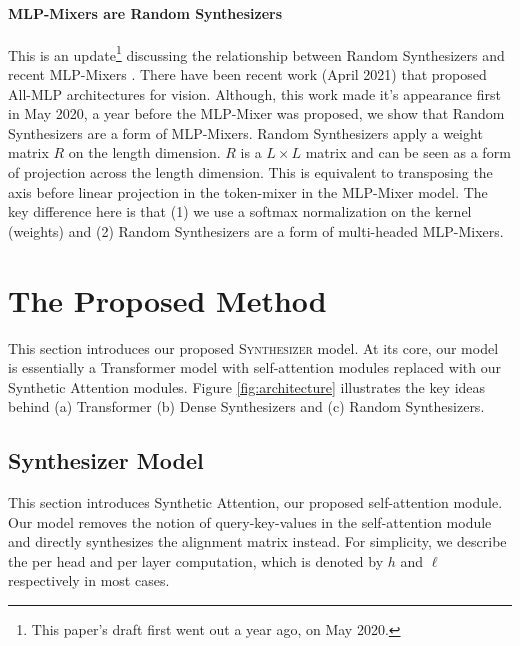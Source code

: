 \documentclass{article}
\begin{document}
\paragraph{MLP-Mixers are Random Synthesizers}
This is an update\footnote{This paper's draft first went out a year ago, on May 2020.} discussing the relationship between Random Synthesizers and recent MLP-Mixers \citep{tolstikhin2021mlp}. There have been recent work (April 2021) that proposed All-MLP architectures for vision. Although, this work made it's appearance first in May 2020, a year before the MLP-Mixer was proposed, we show that Random Synthesizers are a form of MLP-Mixers. Random Synthesizers apply a weight matrix $R$ on the length dimension. $R$ is a $L \times L$ matrix and can be seen as a form of projection across the length dimension. This is equivalent to transposing the axis before linear projection in the token-mixer in the MLP-Mixer model. The key difference here is that (1) we use a softmax normalization on the kernel (weights) and (2) Random Synthesizers are a form of multi-headed MLP-Mixers.

\section{The Proposed Method}
This section introduces our proposed \textsc{Synthesizer} model. At its core, our model is essentially a Transformer model with self-attention modules replaced with our Synthetic Attention modules. Figure \ref{fig:architecture} illustrates the key ideas behind (a) Transformer (b) Dense Synthesizers and (c) Random Synthesizers.

\subsection{Synthesizer Model}
This section introduces Synthetic Attention, our proposed self-attention module. Our model removes the notion of query-key-values in the self-attention module and directly synthesizes the alignment matrix instead. For simplicity, we describe the per head and per layer computation, which is denoted by $h$ and $\ell$ respectively in most cases.
\end{document}
